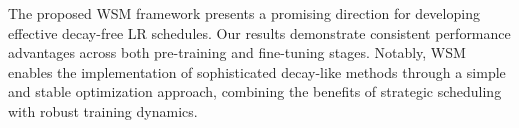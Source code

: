 The proposed WSM framework presents a promising direction for developing effective decay-free LR schedules. Our results demonstrate consistent performance advantages across both pre-training and fine-tuning stages. Notably, WSM enables the implementation of sophisticated decay-like methods through a simple and stable optimization approach, combining the benefits of strategic scheduling with robust training dynamics.












